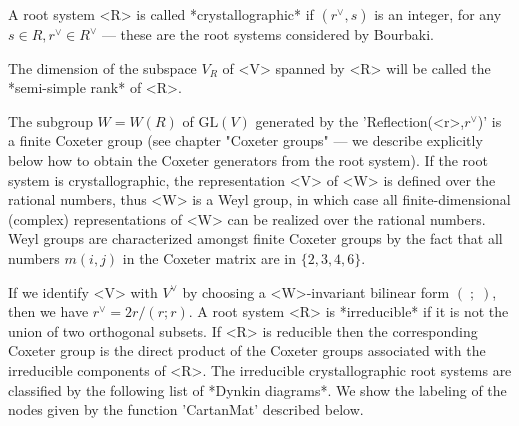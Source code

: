 A  root  system  <R>  is  called  *crystallographic*  if $(r^\vee,s)$ is an
integer,  for any $s\in R,r^\vee\in R^\vee$  --- these are the root systems
considered by Bourbaki.

The dimension of the subspace $V_R$ of <V> spanned by <R> will be called
the *semi-simple rank* of <R>.

The subgroup $W=W(R)$ of $\mbox{GL}(V)$ generated by the
'Reflection(<r>,$r^\vee$)'  is a finite Coxeter group (see chapter "Coxeter
groups"  ---  we  describe  explicitly  below  how  to  obtain  the Coxeter
generators  from the root system). If  the root system is crystallographic,
the  representation <V> of  <W> is defined  over the rational numbers, thus
<W>  is  a  Weyl  group,  in  which  case  all finite-dimensional (complex)
representations  of <W>  can be  realized over  the rational  numbers. Weyl
groups are characterized amongst finite Coxeter groups by the fact that all
numbers $m(i,j)$ in the Coxeter matrix are in $\{2,3,4,6\}$.

If  we identify <V> with $V^\vee$ by choosing a <W>-invariant bilinear form
$(\;;\;)$,   then  we  have   $r^\vee=2r/(r;r)$.  A  root   system  <R>  is
*irreducible*  if it is not the union  of two orthogonal subsets. If <R> is
reducible then the corresponding Coxeter group is the direct product of the
Coxeter  groups  associated  with  the  irreducible  components of <R>. The
irreducible  crystallographic root systems are  classified by the following
list  of *Dynkin diagrams*. We show the  labeling of the nodes given by the
function 'CartanMat' described below.

